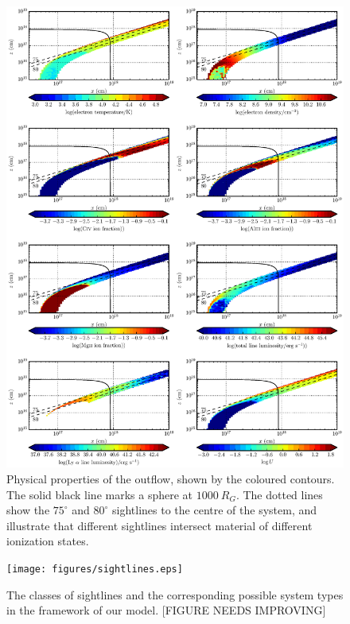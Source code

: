 \documentclass[useAMS,usenatbib]{mn2e_x}
\begin{document}
\begin{figure}
\centering
\includegraphics[width=1.0\textwidth]{figures/wind.eps}
\caption
{
Physical properties of the outflow, shown by the coloured contours.
The solid black line marks a sphere at $1000~R_G$.
The dotted lines show the $75^\circ$ and $80^\circ$ sightlines 
to the centre of the system, and illustrate that different sightlines
intersect material of different ionization states.
}
\label{fig:uvspec}
\end{figure}

\begin{figure}
\centering
\texttt{[image: figures/sightlines.eps]}
\caption
{
The classes of sightlines and the corresponding possible 
system types in the framework of our model.
[FIGURE NEEDS IMPROVING]
}
\label{fig:lobal}
\end{figure}
\end{document}
